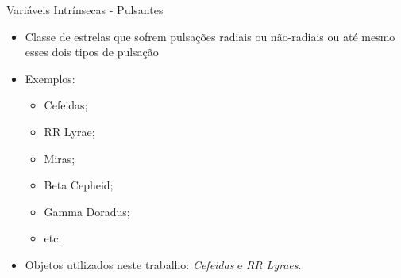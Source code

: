 \documentclass{beamer}
\begin{document}



\begin{frame}{Variáveis Intrínsecas - Pulsantes}
\begin{itemize}
  \item Classe de estrelas que sofrem pulsações radiais
ou não-radiais ou até mesmo esses dois tipos de pulsação
  \item Exemplos:
  \begin{itemize}
    \item Cefeidas;
    \item RR Lyrae;
    \item Miras;
    \item Beta Cepheid;
    \item Gamma Doradus;
    \item etc.
  \end{itemize}
\item Objetos utilizados neste trabalho: \textit{Cefeidas} e \textit{RR Lyraes}.
\end{itemize}
\end{frame}
\end{document}
